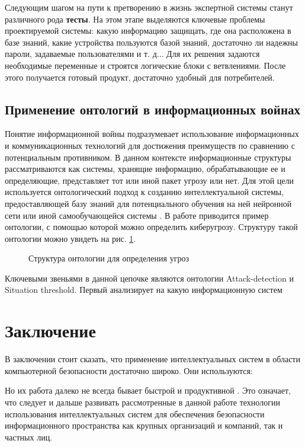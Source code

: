 Следующим шагом на пути к претворению в жизнь экспертной системы станут различного рода \textbf{тесты}.
На этом этапе выделяются ключевые проблемы проектируемой системы: какую информацию защищать, где она
расположена в базе знаний, какие устройства пользуются базой знаний, достаточно ли надежны пароли,
задаваемые пользователями и т. д... Для их решения задаются необходимые переменные и строятся логические
блоки с ветвлениями. После этого получается готовый продукт, достаточно удобный для потребителей.

\subsection{Применение онтологий в информационных войнах}
Понятие информационной войны подразумевает использование информационных и коммуникационных
технологий для достижения преимуществ по сравнению с потенциальным противником. В данном контексте
информационные структуры рассматриваются как системы, хранящие информацию, обрабатывающие ее и определяющие,
представляет тот или иной пакет угрозу или нет. Для этой цели используется онтологический подход к созданию
интеллектуальной системы, предоставляющей базу знаний для потенциального обучения на ней нейронной сети
или иной самообучающейся системы \cite{wars}. В работе \cite{wars} приводится пример онтологии, с помощью которой
можно определить киберугрозу. Структуру такой онтологии можно увидеть на рис. \ref{ont}.

\begin{figure}[h]
    \caption{Структура онтологии для определения угроз \cite{wars}}
    \label{ont}
\end{figure}

Ключевыми звеньями в данной цепочке являются онтологии Attack-detection и Situation threshold.
Первый анализирует на какую информационную систем


\section{Заключение}
В заключении стоит сказать, что применение интеллектуальных систем в области компьютерной безопасности
достаточно широко. Они используются:


Но их работа далеко не всегда бывает быстрой и продуктивной \cite{upg}. Это означает,
что следует и дальше развивать рассмотренные в данной работе технологии использования интеллектуальных
систем для обеспечения безопасности информационного пространства как крупных организаций и компаний, так
и частных лиц.
\newpage


